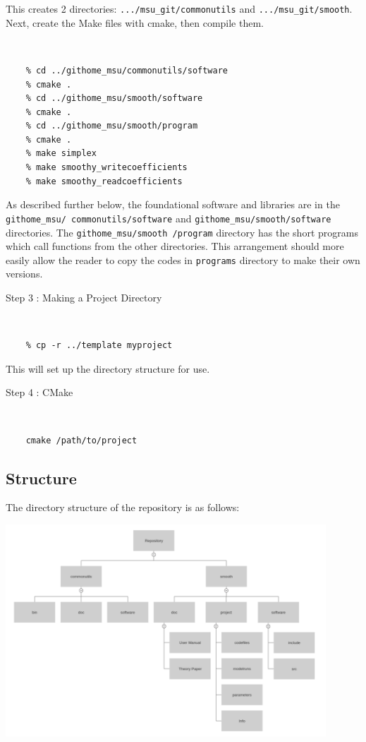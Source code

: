 \documentclass[12pt]{article}
\numberwithin{equation}{section}
\numberwithin{figure}{section}
\begin{document}
This creates 2 directories: {\tt .../msu\_git/commonutils} and {\tt .../msu\_git/smooth}. Next, create the Make files with cmake, then compile them.
{\tt 
\begin{verbatim}
    % cd ../githome_msu/commonutils/software
    % cmake .
    % cd ../githome_msu/smooth/software
    % cmake .
    % cd ../githome_msu/smooth/program
    % cmake .
    % make simplex
    % make smoothy_writecoefficients
    % make smoothy_readcoefficients
\end{verbatim}
}
As described further below, the foundational software and libraries are in the {\tt githome\_msu/ commonutils/software} and {\tt githome\_msu/smooth/software} directories. The {\tt githome\_msu/smooth /program} directory has the short programs which call functions from the other directories. This arrangement should more easily allow the reader to copy the codes in {\tt programs} directory to make their own versions.

\begin{description}
\item[Step 3 : Making a Project Directory] 
\end{description}
{\tt 
\begin{verbatim}
    % cp -r ../template myproject
\end{verbatim}
}
     
This will set up the directory structure for use.  \\ 

\begin{description}
\item[Step 4 : CMake]
\end{description}

{\tt 
\begin{verbatim}
    cmake /path/to/project
\end{verbatim}
}

\subsection{Structure}

The directory structure of the repository is as follows: 

\includegraphics[width = 120mm]{Structure_Tree.png}
\end{document}
